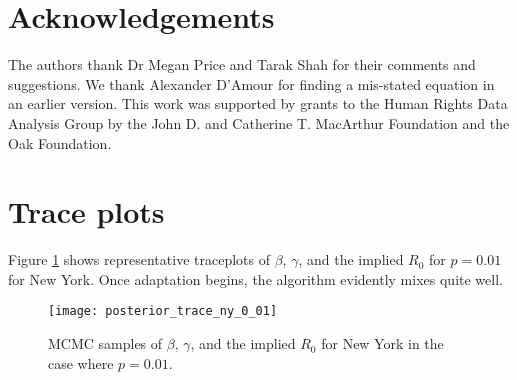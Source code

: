 \documentclass[11pt]{article}
\theoremstyle{plain}
\newcommand{\1}{\mathbf 1}
\begin{document}
\section{Acknowledgements}


The authors thank Dr Megan Price and Tarak Shah for their comments and suggestions.  We thank Alexander D'Amour for finding a mis-stated equation in an earlier version. This work was supported by grants to the Human Rights Data Analysis Group by the John D. and Catherine T. MacArthur Foundation and the Oak Foundation.

\appendix
\section{Trace plots}
Figure \ref{fig:traceplots} shows representative traceplots of $\beta$, $\gamma$, and the implied $R_0$ for $p=0.01$ for New York. Once adaptation begins, the algorithm evidently mixes quite well.

\begin{figure}[h]
\centering
 \texttt{[image: posterior\_trace\_ny\_0\_01]}
 \caption{\label{fig:traceplots} MCMC samples of $\beta$, $\gamma$, and the implied $R_0$ for New York in the case where $p=0.01$. }
\end{figure}







\end{document}
